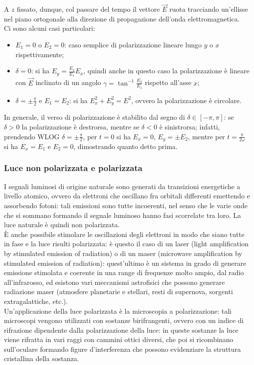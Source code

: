 A $ z $ fissato, dunque, col passare del tempo il vettore $ \vec{E} $ ruota tracciando un'ellisse nel piano ortogonale alla direzione di propagazione dell'onda elettromagnetica. \\ 
%
Ci sono alcuni casi particolari:
\begin{itemize}
	\item $ E_1 = 0 $ o $ E_2 = 0 $: caso semplice di polarizzazione lineare lungo $ y $ o $ x $ rispettivamente;
	\item $ \delta = 0 $: si ha $ E_y = \frac{E_2}{E_1} E_x $, quindi anche in questo caso la polarizzazione è lineare con $ \vec{E} $ inclinato di un angolo $ \gamma = \tan^{-1} \frac{E_2}{E_1} $ rispetto all'asse $ x $;
	\item $ \delta = \pm \frac{\pi}{2} $ e $ E_1 = E_2 $: si ha $ E_x^2 + E_y^2 = E^2 $, ovvero la polarizzazione è circolare. 
\end{itemize}
In generale, il verso di polarizzazione è stabilito dal segno di $ \delta \in [-\pi,\pi] $: se $ \delta > 0 $ la polarizzazione è destrorsa, mentre se $ \delta < 0 $ è sinistrorsa; infatti, prendendo WLOG $ \delta = \pm \frac{\pi}{2} $, per $ t = 0 $ si ha $ E_x = 0 $, $ E_y = \pm E_2 $, mentre per $ t = \frac{\pi}{2\omega} $ si ha $ E_x = E_1 $ e $ E_2 = 0 $, dimostrando quanto detto prima.

\subsubsection{Luce non polarizzata e polarizzata}

I segnali luminosi di origine naturale sono generati da transizioni energetiche a livello atomico, ovvero da elettroni che oscillano fra orbitali differenti emettendo e assorbendo fotoni: tali emissioni sono tutte incoerenti, nel senso che le varie onde che si sommano formando il segnale luminoso hanno fasi scorrelate tra loro. La luce naturale è quindi non polarizzata. \\ 
%
È anche possibile stimolare le oscillazioni degli elettroni in modo che siano tutte in fase e la luce risulti polarizzata: è questo il caso di un laser (light amplification by stimulated emission of radiation) o di un maser (microwave amplification by stimulated emission of radiation): quest'ultimo è un sistema in grado di generare emissione stimolata e coerente in una range di frequenze molto ampio, dal radio all'infrarosso, ed esistono vari meccanismi astrofisici che possono generare radiazione maser (atmosfere planetarie e stellari, resti di supernova, sorgenti extragalattiche, etc.). \\ 
%
Un'applicazione della luce polarizzata è la microscopia a polarizzazione: tali microscopi vengono utilizzati con sostanze birifrangenti, ovvero con un indice di rifrazione dipendente dalla polarizzazione della luce: in queste sostanze la luce viene rifratta in vari raggi con cammini ottici diversi, che poi si ricombinano sull'oculare formando figure d'interferenza che possono evidenziare la struttura cristallina della sostanza.

